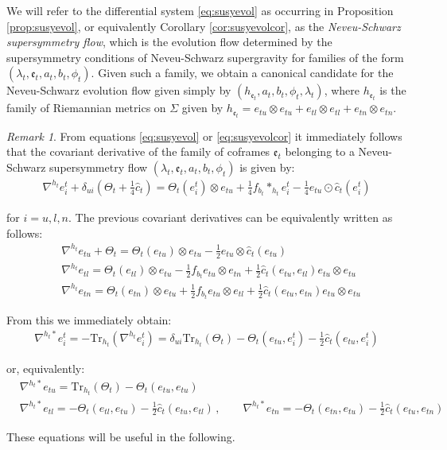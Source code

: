 \documentclass[10pt,reqno,a4paper]{amsart}
\theoremstyle{plain}
\theoremstyle{definition}
\theoremstyle{remark}
\newtheorem{remark}[thm]{Remark}
\theoremstyle{remark}
\newcommand{\Tr}{\mathrm{Tr}}
\def\fre{\mathfrak{e}}
\renewcommand{\(}{ (}
\renewcommand{\)}{ )}
\begin{document}
\noindent
We will refer to the differential system \eqref{eq:susyevol} as occurring in Proposition \ref{prop:susyevol}, or equivalently Corollary \ref{cor:susyevolcor}, as the \emph{Neveu-Schwarz supersymmetry flow}, which is the evolution flow determined by the supersymmetry conditions of Neveu-Schwarz supergravity for families of the form $(\lambda_t,\fre_t,a_t,b_t,\phi_t)$. Given such a family, we obtain a canonical candidate for the Neveu-Schwarz evolution flow given simply by $(h_{\fre_t},a_t,b_t,\phi_t,\lambda_t)$, where $h_{\fre_t}$ is the family of Riemannian metrics on $\Sigma$ given by $h_{\fre_t}=e_{tu}\otimes e_{tu}+e_{tl}\otimes e_{tl}+e_{tn}\otimes e_{tn}$.  
\begin{remark}
\label{remark:covariantevolution}
From equations \eqref{eq:susyevol} or \eqref{eq:susyevolcor} it immediately follows that the covariant derivative of the family of coframes $\fre_t$ belonging to a Neveu-Schwarz supersymmetry flow $(\lambda_t,\fre_t,a_t,b_t,\phi_t)$ is given by:
\begin{eqnarray*}
\nabla^{h_t}e^t_i+\delta_{ui}(\Theta_t+\frac{1}{4}\widehat{c}_t )=\Theta_t(e^t_i)\otimes e_{tu}+\frac{1}{4}f_{b_t}\ast_{h_t}e^t_i-\frac{1}{4}e_{tu}\odot\widehat{c}_t (e^t_i)
\end{eqnarray*}

\noindent
for $i = u, l, n$. The previous covariant derivatives can be equivalently written as follows: 
\begin{eqnarray*}
& \nabla^{h_t}e_{tu}+\Theta_t=\Theta_t(e_{tu})\otimes e_{tu}-\frac{1}{2}e_{tu}\otimes\widehat{c}_t (e_{tu}) \\
& \nabla^{h_t}e_{tl}=\Theta_t(e_{tl})\otimes e_{tu}-\frac{1}{2}f_{b_t}e_{tu}\otimes e_{tn}+\frac{1}{2}\widehat{c}_t (e_{tu},e_{tl})e_{tu}\otimes e_{tu}\\
& \nabla^{h_t}e_{tn}=\Theta_t(e_{tn})\otimes e_{tu}+\frac{1}{2}f_{b_t}e_{tu}\otimes e_{tl}+\frac{1}{2}\widehat{c}_t (e_{tu},e_{tn})e_{tu}\otimes e_{tu}
\end{eqnarray*}
	
\noindent
From this we immediately obtain:
\begin{eqnarray*}
\nabla^{h_t\ast}e^t_i=-\Tr_{h_t}(\nabla^{h_t}e^t_i)=\delta_{ui}\Tr_{h_t}(\Theta_t)-\Theta_t(e_{tu},e^t_i)-\frac{1}{2}\widehat{c}_t (e_{tu},e^t_i)
\end{eqnarray*}

\noindent
or, equivalently:
\begin{eqnarray*}
& \nabla^{h_t\ast}e_{tu}=\Tr_{h_t}(\Theta_t)-\Theta_t(e_{tu},e_{tu})\\
& \nabla^{h_t\ast}e_{tl}=-\Theta_t(e_{tl},e_{tu})-\frac{1}{2}\widehat{c}_t (e_{tu},e_{tl})\, , \qquad
\nabla^{h_t\ast}e_{tn}=-\Theta_t(e_{tn},e_{tu})-\frac{1}{2}\widehat{c}_t (e_{tu},e_{tn})
\end{eqnarray*}
	
\noindent
These equations will be useful in the following.
\end{remark} 
\end{document}
